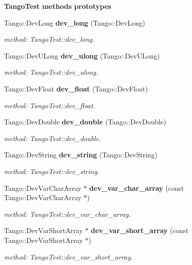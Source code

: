 \begin{Indent}{\bf Tango\-Test methods prototypes}
\begin{CompactItemize}
Tango::Dev\-Long {\bf dev\_\-long} (Tango::Dev\-Long)
\begin{CompactList}\small\item\em method: Tango\-Test::dev\_\-long.\item\end{CompactList}\item 
Tango::Dev\-ULong {\bf dev\_\-ulong} (Tango::Dev\-ULong)
\begin{CompactList}\small\item\em method: Tango\-Test::dev\_\-ulong.\item\end{CompactList}\item 
Tango::Dev\-Float {\bf dev\_\-float} (Tango::Dev\-Float)
\begin{CompactList}\small\item\em method: Tango\-Test::dev\_\-float.\item\end{CompactList}\item 
Tango::Dev\-Double {\bf dev\_\-double} (Tango::Dev\-Double)
\begin{CompactList}\small\item\em method: Tango\-Test::dev\_\-double.\item\end{CompactList}\item 
Tango::Dev\-String {\bf dev\_\-string} (Tango::Dev\-String)
\begin{CompactList}\small\item\em method: Tango\-Test::dev\_\-string.\item\end{CompactList}\item 
Tango::Dev\-Var\-Char\-Array $\ast$ {\bf dev\_\-var\_\-char\_\-array} (const Tango::Dev\-Var\-Char\-Array $\ast$)
\begin{CompactList}\small\item\em method: Tango\-Test::dev\_\-var\_\-char\_\-array.\item\end{CompactList}\item 
Tango::Dev\-Var\-Short\-Array $\ast$ {\bf dev\_\-var\_\-short\_\-array} (const Tango::Dev\-Var\-Short\-Array $\ast$)
\begin{CompactList}\small\item\em method: Tango\-Test::dev\_\-var\_\-short\_\-array.\item\end{CompactList}\item 

\end{CompactItemize}
\end{Indent}
